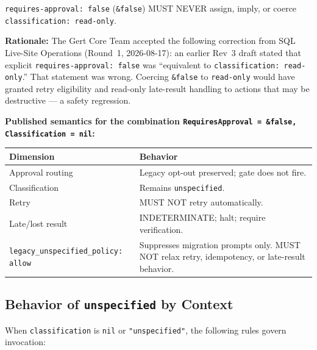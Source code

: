 \texttt{requires-approval: false} (\texttt{\&false}) MUST NEVER assign, imply,
or coerce \texttt{classification: read-only}.

\textbf{Rationale:} The Gert Core Team accepted the following correction from
SQL Live-Site Operations (Round~1, 2026-08-17): an earlier Rev~3 draft stated
that explicit \texttt{requires-approval: false} was ``equivalent to
\texttt{classification: read-only}.''  That statement was wrong.  Coercing
\texttt{\&false} to \texttt{read-only} would have granted retry eligibility and
read-only late-result handling to actions that may be destructive — a safety
regression.

\textbf{Published semantics for the combination
\texttt{RequiresApproval = \&false, Classification = nil}:}

\begin{center}
\begin{tabular}{ll}
\toprule
\textbf{Dimension} & \textbf{Behavior} \\
\midrule
Approval routing    & Legacy opt-out preserved; gate does not fire. \\
Classification      & Remains \texttt{unspecified}. \\
Retry               & MUST NOT retry automatically. \\
Late/lost result    & INDETERMINATE; halt; require verification. \\
\texttt{legacy\_unspecified\_policy: allow} &
    Suppresses migration prompts only.  MUST NOT relax retry,
    idempotency, or late-result behavior. \\
\bottomrule
\end{tabular}
\end{center}

\subsection{Behavior of \texttt{unspecified} by Context}
\label{subsec:rp-unspecified-by-context}

When \texttt{classification} is \texttt{nil} or \texttt{"unspecified"}, the
following rules govern invocation:


